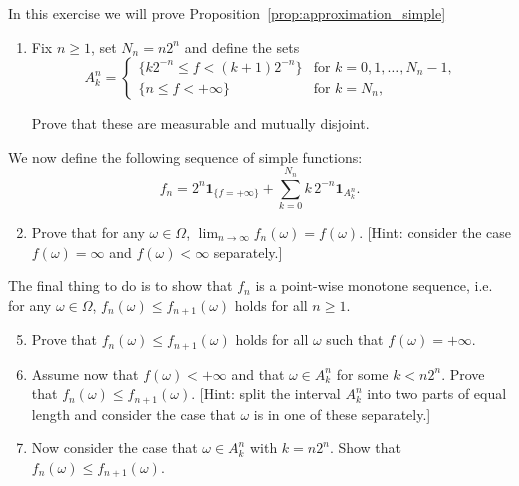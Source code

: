 \begin{problem}\label{prb:approximation_simple}
In this exercise we will prove Proposition~\ref{prop:approximation_simple}

\begin{enumerate}[label=(\alph*)]
\item Fix $n \ge 1$, set $N_n = n 2^n$ and define the sets
\[
	A_k^n = \begin{cases}
		\{ k 2^{-n} \le f < (k+1) 2^{-n}\} &\text{for } k = 0,1, \dots, N_n - 1,\\
		\{ n \le f < +\infty\} &\text{for } k = N_n,
	\end{cases}
\]

Prove that these are measurable and mutually disjoint.
\end{enumerate}

We now define the following sequence of simple functions:
\[
	f_n = 2^n\mathbf{1}_{\{f=+\infty\}} + \sum_{k=0}^{N_n} k \, 2^{-n} \mathbf{1}_{A_k^n}.
\]

\begin{enumerate}[label=(\alph*)]
\setcounter{enumi}{1}
\item Prove that for any $\omega \in \Omega$, $\lim_{n \to \infty} f_n(\omega) = f(\omega)$. [Hint: consider the case $f(\omega) = \infty$ and $f(\omega) < \infty$ separately.]
\end{enumerate}

The final thing to do is to show that $f_n$ is a point-wise monotone sequence, i.e. for any $\omega \in \Omega$, $f_n(\omega) \le f_{n+1}(\omega)$ holds for all $n \ge 1$.

\begin{enumerate}[label=(\alph*)]
\setcounter{enumi}{4}
\item Prove that $f_n(\omega) \le f_{n+1}(\omega)$ holds for all $\omega$ such that $f(\omega) = +\infty$.
\item Assume now that $f(\omega) < +\infty$ and that $\omega \in A_k^n$ for some $k < n 2^n$. Prove that $f_n(\omega) \le f_{n+1}(\omega)$. [Hint: split the interval $A_k^n$ into two parts of equal length and consider the case that $\omega$ is in one of these separately.]
\item Now consider the case that $\omega \in A_k^n$ with $k = n 2^n$. Show that $f_n(\omega) \le f_{n+1}(\omega)$.
\end{enumerate}

%
%
%


\end{problem}
